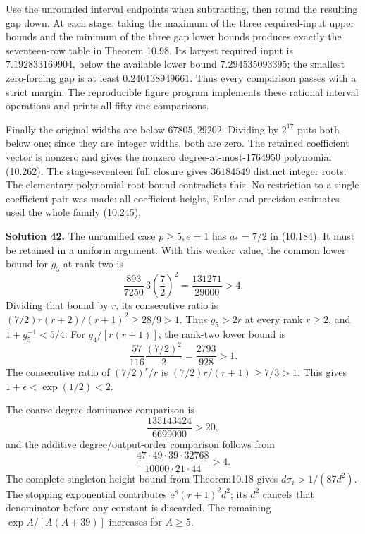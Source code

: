 \documentclass[
  11pt,
  a4paper,
]{article}
\begin{document}
Use the unrounded interval endpoints when subtracting, then round the
resulting gap down. At each stage, taking the maximum of the three
required-input upper bounds and the minimum of the three gap lower
bounds produces exactly the seventeen-row table in Theorem 10.98. Its
largest required input is \(7.192833169904\), below the available lower
bound \(7.294535093395\); the smallest zero-forcing gap is at least
\(0.240138949661\). Thus every comparison passes with a strict margin.
The \href{../figure_sources/first_contraction_budget.py}{reproducible
figure program} implements these rational interval operations and prints
all fifty-one comparisons.

Finally the original widths are below \(67805,29202\). Dividing by
\(2^{17}\) puts both below one; since they are integer widths, both are
zero. The retained coefficient vector is nonzero and gives the nonzero
degree-at-most-\(1764950\) polynomial (10.262). The stage-seventeen full
closure gives \(36184549\) distinct integer roots. The elementary
polynomial root bound contradicts this. No restriction to a single
coefficient pair was made: all coefficient-height, Euler and precision
estimates used the whole family (10.245).

\textbf{Solution 42.} The unramified case \(p\ge5,e=1\) has \(a_*=7/2\)
in (10.184). It must be retained in a uniform argument. With this weaker
value, the common lower bound for \(g_5\) at rank two is \[
\frac{893}{7250}\,3\left(\frac72\right)^2
=\frac{131271}{29000}>4.
\] Dividing that bound by \(r\), its consecutive ratio is
\((7/2)r(r+2)/(r+1)^2\ge28/9>1\). Thus \(g_5>2r\) at every rank
\(r\ge2\), and \(1+g_5^{-1}<5/4\). For \(g_4/[r(r+1)]\), the rank-two
lower bound is \[
\frac{57}{116}\frac{(7/2)^2}{2}
=\frac{2793}{928}>1.
\] The consecutive ratio of \((7/2)^r/r\) is \((7/2)r/(r+1)\ge7/3>1\).
This gives \(1+\epsilon<\exp(1/2)<2\).

The coarse degree-dominance comparison is \[
\frac{135143424}{6699000}>20,
\] and the additive degree/output-order comparison follows from \[
\frac{47\cdot49\cdot39\cdot32768}
{10000\cdot21\cdot44}>4.
\] The complete singleton height bound from Theorem10.18 gives
\(d\sigma_i>1/(87d^2)\). The stopping exponential contributes
\(\mathrm e^8(r+1)^2d^2\); its \(d^2\) cancels that denominator before
any constant is discarded. The remaining \(\exp A/[A(A+39)]\) increases
for \(A\ge5\).
\end{document}
